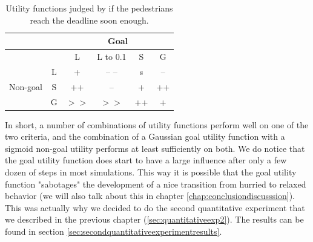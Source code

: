 \documentclass[11pt, a4paper]{book}
\begin{document}
\begin{table}[h!]
\centering
\begin{tabular}{|c|c|c|c|c|c|}
\hline
 &  & \multicolumn{4}{c|}{Goal} \\ 
\hline 
 &  & L & L to 0.1 & S & G \\ 
\hline 
\multirow{3}{*}{Non-goal} & L & + & -- -- & s & -- \\ 
 & S & ++ & -- & + & ++ \\ 
 & G & $>>$ & $>>$ & ++ & + \\ 
\hline 
\end{tabular} 
\caption{Utility functions judged by if the pedestrians reach the deadline soon enough.}
\label{tab:judgegoaldeadline}
\end{table}


%


In short, a number of combinations of utility functions perform well on one of the two criteria, and the combination of a Gaussian goal utility function with a sigmoid non-goal utility performs at least sufficiently on both. We do notice that the goal utility function does start to have a large influence after only a few dozen of steps in most simulations. This way it is possible that the goal utility function "sabotages" the development of a nice transition from hurried to relaxed behavior (we will also talk about this in chapter \ref{chap:conclusiondiscusssion}). This was actually why we decided to do the second quantitative experiment that we described in the previous chapter (\ref{sec:quantitativeexp2}). The results can be found in section \ref{sec:secondquantitativeexperimentresults}.


\end{document}
